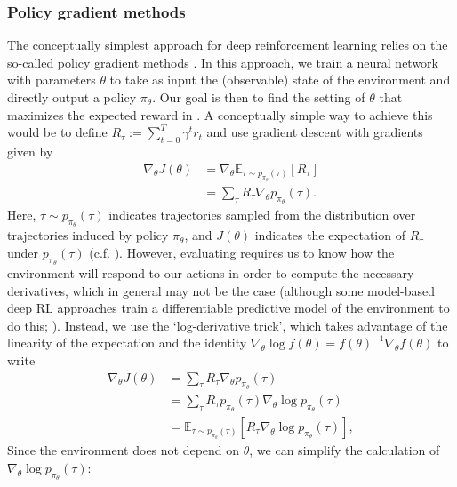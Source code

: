 
\subsubsection*{Policy gradient methods}

The conceptually simplest approach for deep reinforcement learning relies on the so-called policy gradient methods \citep{sutton2018reinforcement}.
In this approach, we train a neural network with parameters $\theta$ to take as input the (observable) state of the environment and directly output a policy $\pi_\theta$.
Our goal is then to find the setting of $\theta$ that maximizes the expected reward in .
A conceptually simple way to achieve this would be to define $R_\tau := \sum_{t=0}^T \gamma^t r_t$ and use gradient descent with gradients given by
\begin{align}
    \nabla_\theta J(\theta) &= \nabla_\theta \mathbb{E}_{\tau \sim p_{\pi_\theta}(\tau)} \left [ R_\tau \right ]\\
    &= \sum_{\tau} R_\tau \nabla_\theta p_{\pi_\theta}(\tau).
    \label{eq:simple_deriv}
\end{align}
Here, $\tau \sim p_{\pi_\theta}(\tau)$ indicates trajectories sampled from the distribution over trajectories induced by policy $\pi_\theta$, and $J(\theta)$ indicates the expectation of $R_\tau$ under $p_{\pi_\theta}(\tau)$ (c.f. ).
However, evaluating  requires us to know how the environment will respond to our actions in order to compute the necessary derivatives, which in general may not be the case (although some model-based deep RL approaches train a differentiable predictive model of the environment to do this; \citealp{clavera2020model}).
Instead, we use the `log-derivative trick', which takes advantage of the linearity of the expectation and the identity $\nabla_\theta \log f(\theta) = f(\theta)^{-1} \nabla_\theta f(\theta)$ to write
\begin{align}
    \label{eq:deriv_J}
    \nabla_\theta J(\theta) & = \sum_\tau R_\tau \nabla_\theta p_{\pi_\theta}(\tau) \\
                            & = \sum_\tau R_\tau p_{\pi_\theta}(\tau) \nabla_\theta \log p_{\pi_\theta}(\tau) \\
                            & = \mathbb{E}_{\tau \sim p_{\pi_\theta}(\tau)} \left [ R_\tau \nabla_\theta \log p_{\pi_\theta}(\tau) \right ],
\end{align}
Since the environment does not depend on $\theta$, we can simplify the calculation of $\nabla_\theta \log p_{\pi_\theta} (\tau)$:
